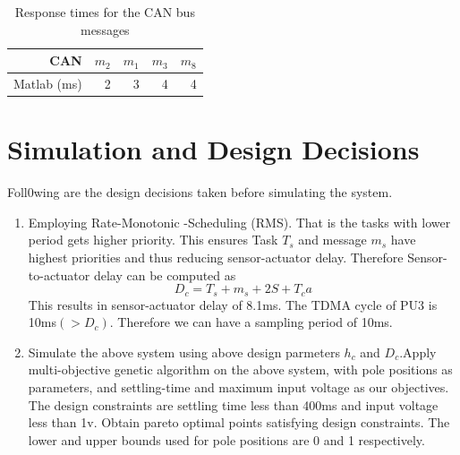 \begin{table}[htbp]
	\centering
	\caption{Response times for the CAN bus messages}
	\begin{tabular}{rrrrr}
		\toprule
		CAN     & $m_2$   & $m_1$   & $m_3$   & $m_8$ \\
		\midrule
		Matlab (ms) & 2       & 3       & 4       & 4 \\
		
	\end{tabular}%
	\label{tab:can-rt}%
\end{table}%



\section{Simulation and Design Decisions}
Foll0wing are the design decisions taken before simulating the system.

\begin{enumerate}
\item Employing Rate-Monotonic -Scheduling (RMS). That is the tasks with lower period gets higher priority. This ensures Task $T_s$ and message $m_s$ have highest priorities and thus reducing sensor-actuator delay. Therefore Sensor-to-actuator delay can be computed as 
$$D_c=T_s+m_s+2S+T_ca$$ This results in sensor-actuator delay of 8.1ms.
The TDMA cycle of PU3 is 10ms$(>D_c)$. Therefore we can have a sampling period of 10ms.
\item Simulate the above system using above design parmeters $h_c$ and $D_c$.Apply multi-objective genetic algorithm on the above system, with pole positions as parameters, and settling-time and maximum input voltage as our objectives. The design constraints are settling time less than 400ms and input voltage less than 1v. Obtain pareto optimal points satisfying design constraints.  The lower and upper bounds used for pole positions are 0 and 1 respectively.
\end{enumerate}

